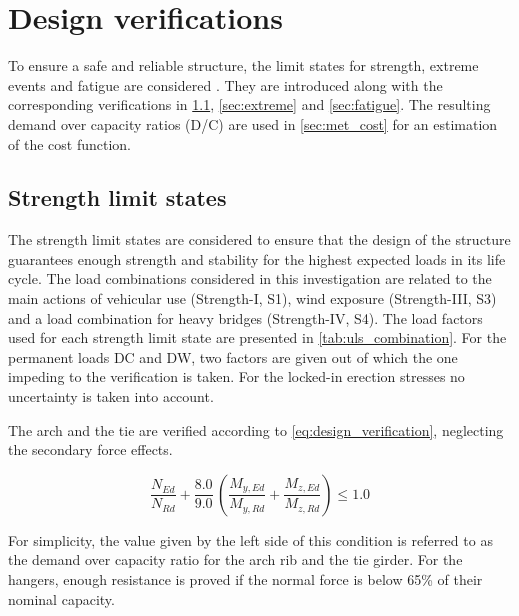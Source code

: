 \section{Design verifications} \label{sec:met_ver}
To ensure a safe and reliable structure, the limit states for strength, extreme events and fatigue are considered \cite{AASHTO}. They are introduced along with the corresponding verifications in \cref{sec:strength}, \cref{sec:extreme} and \cref{sec:fatigue}. The resulting demand over capacity ratios (D/C) are used in \cref{sec:met_cost} for an estimation of the cost function.

\subsection{Strength limit states}\label{sec:strength}
The strength limit states are considered to ensure that the design of the structure guarantees enough strength and stability for the highest expected loads in its life cycle. The load combinations considered in this investigation are related to the main actions of vehicular use (Strength-I, S1), wind exposure (Strength-III, S3) and a load combination for heavy bridges (Strength-IV, S4). The load factors used for each strength limit state are presented in \cref{tab:uls_combination}. For the permanent loads DC and DW, two factors are given out of which the one impeding to the verification is taken. For the locked-in erection stresses no uncertainty is taken into account.



The arch and the tie are verified according to \cref{eq:design_verification}, neglecting the secondary force effects. 

\begin{equation}
    \frac{N_{Ed}}{N_{Rd}} + \frac{8.0}{9.0}\, \left(\frac{M_{y,Ed}}{M_{y,Rd}}+\frac{M_{z,Ed}}{M_{z,Rd}} \right) \leq 1.0
    \label{eq:design_verification}
\end{equation}

For simplicity, the value given by the left side of this condition is referred to as the demand over capacity ratio for the arch rib and the tie girder. For the hangers, enough resistance is proved if the normal force is below 65\% of their nominal capacity. 

